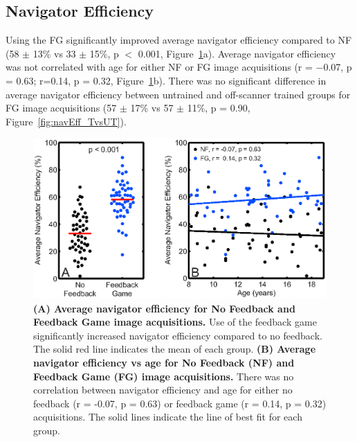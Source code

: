 \subsection{Navigator Efficiency}
	Using the FG significantly improved average navigator efficiency compared to NF (58 $\pm$ 13\% vs 33 $\pm$ 15\%, p $<$ 0.001, Figure~\ref{fig:navEff_FGvsNF}a). Average navigator efficiency was not correlated with age for either NF or FG image acquisitions (r = −0.07, p = 0.63; r=0.14, p = 0.32, Figure~\ref{fig:navEff_FGvsNF}b). There was no significant difference in average navigator efficiency between untrained and off-scanner trained groups for FG image acquisitions (57 $\pm$ 17\% vs 57 $\pm$ 11\%, p = 0.90, Figure~\ref{fig:navEff_TvsUT}).
	
	\begin{figure}
		\centering %
		\includegraphics{figures/gamepaper/03-navEffAve_NFvsFG_AND_vsAge}
		\caption[Navigator Efficiency for Feedback Game vs No Feedback]{\textbf{(A) Average navigator efficiency for No Feedback and Feedback Game image acquisitions.} Use of the feedback game significantly increased navigator efficiency compared to no feedback. The solid red line indicates the mean of each group. \textbf{(B) Average navigator efficiency vs age for No Feedback (NF) and Feedback Game (FG) image acquisitions.} There was no correlation between navigator efficiency and age for either no feedback (r = -0.07, p = 0.63) or feedback game (r = 0.14, p = 0.32) acquisitions. The solid lines indicate the line of best fit for each group.}
		\label{fig:navEff_FGvsNF}
	\end{figure}


